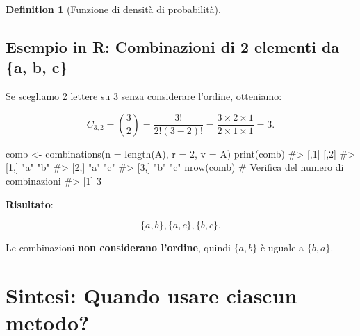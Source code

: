 \documentclass[
  letterpaper,
  DIV=11,
  numbers=noendperiod,
  oneside]{scrreprt}
\newenvironment{Shaded}{\begin{snugshade}}{\end{snugshade}}
\newcommand{\AttributeTok}[1]{\textcolor[rgb]{0.40,0.45,0.13}{#1}}
\newcommand{\CommentTok}[1]{\textcolor[rgb]{0.37,0.37,0.37}{#1}}
\newcommand{\DecValTok}[1]{\textcolor[rgb]{0.68,0.00,0.00}{#1}}
\newcommand{\FunctionTok}[1]{\textcolor[rgb]{0.28,0.35,0.67}{#1}}
\newcommand{\NormalTok}[1]{\textcolor[rgb]{0.00,0.23,0.31}{#1}}
\newcommand{\OtherTok}[1]{\textcolor[rgb]{0.00,0.23,0.31}{#1}}
\theoremstyle{definition}
\theoremstyle{plain}
\theoremstyle{definition}
\newtheorem{definition}{Definition}[chapter]
\theoremstyle{remark}
\begin{document}
\begin{definition}[Funzione di densità di
probabilità]
\subsection{Esempio in R: Combinazioni di 2 elementi da \{a, b,
c\}}\label{esempio-in-r-combinazioni-di-2-elementi-da-a-b-c}

Se scegliamo 2 lettere su 3 senza considerare l'ordine, otteniamo:

\[
C_{3,2} = \binom{3}{2} = \frac{3!}{2!(3-2)!} = \frac{3 \times 2 \times 1}{2 \times 1 \times 1} = 3.
\]

\begin{Shaded}
\begin{Highlighting}[]
\NormalTok{comb }\OtherTok{\textless{}{-}} \FunctionTok{combinations}\NormalTok{(}\AttributeTok{n =} \FunctionTok{length}\NormalTok{(A), }\AttributeTok{r =} \DecValTok{2}\NormalTok{, }\AttributeTok{v =}\NormalTok{ A)}
\FunctionTok{print}\NormalTok{(comb)}
\CommentTok{\#\textgreater{}      [,1] [,2]}
\CommentTok{\#\textgreater{} [1,] "a"  "b" }
\CommentTok{\#\textgreater{} [2,] "a"  "c" }
\CommentTok{\#\textgreater{} [3,] "b"  "c"}
\FunctionTok{nrow}\NormalTok{(comb)  }\CommentTok{\# Verifica del numero di combinazioni}
\CommentTok{\#\textgreater{} [1] 3}
\end{Highlighting}
\end{Shaded}

\textbf{Risultato}:

\[
\{a, b\}, \{a, c\}, \{b, c\}.
\]

Le combinazioni \textbf{non considerano l'ordine}, quindi \(\{a, b\}\) è
uguale a \(\{b, a\}\).

\section{Sintesi: Quando usare ciascun
metodo?}\label{sintesi-quando-usare-ciascun-metodo}


\end{definition}
\end{document}
